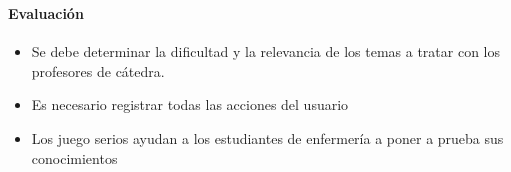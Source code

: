 \begin{frame}
\frametitle{\pagetitle}
\framesubtitle{Evaluación}
\begin{itemize}[<+->]

\item Se debe determinar la dificultad y la relevancia de los temas a tratar con los
    profesores de cátedra.

\item Es necesario registrar todas las acciones del usuario

\item Los juego serios ayudan a los estudiantes de enfermería a poner a
        prueba sus conocimientos

\end{itemize}
\end{frame}
